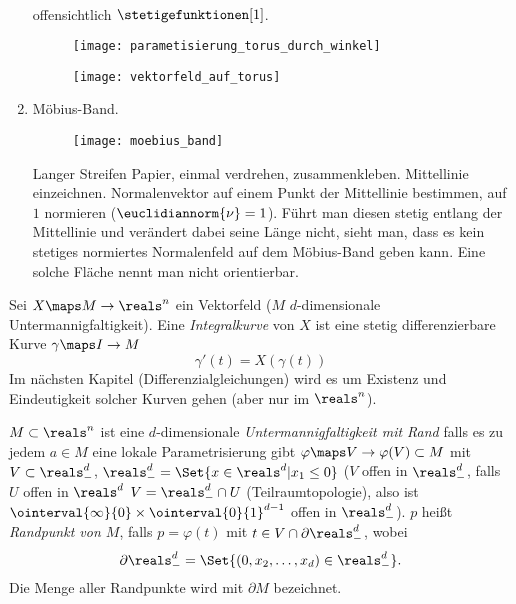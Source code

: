 \begin{beispiele*}
\begin{enumerate}
\begin{gather*}
  \end{gather*}
  offensichtlich \( \stetigefunktionen[1] \).
  \begin{figure}[H]
    \centering
    \texttt{[image: parametisierung\_torus\_durch\_winkel]}
    \label{fig:parametisierung_torus_durch_winkel}
  \end{figure}
  \begin{figure}[H]
    \centering
    \texttt{[image: vektorfeld\_auf\_torus]}
    \label{fig:vektorfeld_auf_torus}
  \end{figure}
  \item Möbius-Band. 
  \begin{figure}[H]
    \centering
    \texttt{[image: moebius\_band]}
    \label{fig:moebius_band}
  \end{figure}
  Langer Streifen Papier, einmal verdrehen, zusammenkleben. Mittellinie einzeichnen. Normalenvektor auf einem Punkt der Mittellinie bestimmen, auf \( 1 \) normieren (\( \euclidiannorm{\nu}=1 \)). Führt man diesen stetig entlang der Mittellinie und verändert dabei seine Länge nicht, sieht man, dass es kein stetiges normiertes Normalenfeld auf dem Möbius-Band geben kann. Eine solche Fläche nennt man nicht orientierbar. 
  \end{enumerate}
\end{beispiele*}
\begin{definition}
  Sei \( X\maps M\to \reals^n  \) ein Vektorfeld (\( M \) \( d \)-dimensionale Untermannigfaltigkeit). Eine \emph{Integralkurve} von \( X \) ist eine stetig differenzierbare Kurve \( \gamma\maps I\to M \) \sd
  \begin{equation*}
    \gamma'(t)=X(\gamma(t))
  \end{equation*}
  Im nächsten Kapitel (Differenzialgleichungen) wird es um Existenz und Eindeutigkeit solcher Kurven gehen (aber nur im \( \reals^n \)).
\end{definition}
\begin{definition}\label{untermannigfaltigkeit_mit_rand}
  \( M\subset \reals^n \) ist eine \( d \)-dimensionale \emph{Untermannigfaltigkeit mit Rand} falls es zu jedem \( a\in M \) eine lokale Parametrisierung gibt \( \varphi\maps V\to \varphi(V)\subset M \) mit \( V\subset \reals^d_{-} \), \( \reals^d_{-}=\Set{x\in \reals^d|x_1\leq 0} \) (\( V \) offen in \( \reals^d_{-} \), falls \texists  \( U \) offen in \( \reals^d \) \sd \( V=\reals^d_{-}\cap U \) (Teilraumtopologie), also \zb ist \( \ointerval{\infty}{0}\times \ointerval{0}{1}^{d-1} \) offen in \( \reals^{d}_{-} \)). \( p \) heißt \emph{Randpunkt von \( M \)}, falls \( p=\varphi(t) \) mit \( t\in V\cap \partial \reals^d_{-} \), wobei
  \begin{equation*}
    \partial \reals^d_{-}=\Set{(0,x_2,\dotsc,x_{d})\in \reals^d_{-}}.
  \end{equation*}
  Die Menge aller Randpunkte wird mit \( \partial M \) bezeichnet.
\end{definition}
